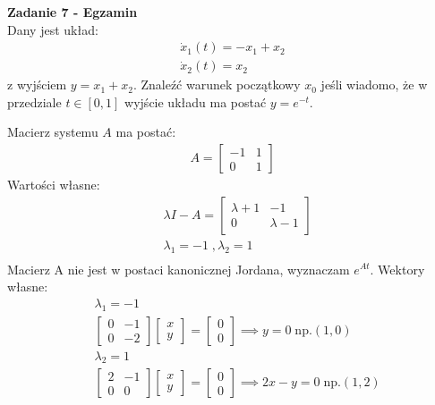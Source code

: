 \documentclass[a4paper,11pt]{article}
\begin{document}
\newpage
\begin{framed}
\textbf{Zadanie 7 - Egzamin} \\ 
Dany jest układ:
\begin{align*}
\dot{x}_1(t)=-x_1+x_2 \\
\dot{x}_2(t)=x_2
\end{align*}
z wyjściem \( y = x_1 + x_2 \). Znaleźć warunek początkowy \( x_0 \) jeśli wiadomo, że w przedziale \( t \in [0,1] \) wyjście układu ma postać \( y = e^{-t} \). 
\end{framed}
Macierz systemu \( A \) ma postać:
\begin{align*}
A = 
\begin{bmatrix}
-1 & 1 \\
0 & 1
\end{bmatrix}
\end{align*}
Wartości własne:
\begin{align*}
&\lambda I - A =
\begin{bmatrix}
\lambda + 1 & -1 \\
0 & \lambda -1
\end{bmatrix} \\
& \lambda _1 = -1 \; , \lambda _ 2 = 1 \\
\end{align*}
Macierz A nie jest w postaci kanonicznej Jordana, wyznaczam \( e^{At} \). Wektory własne: \\
\begin{align*}
&\lambda _1 = -1 \\
&\begin{bmatrix}
0 & -1 \\
0 & -2
\end{bmatrix}
\begin{bmatrix}
x \\
y
\end{bmatrix}
=
\begin{bmatrix}
0 \\
0
\end{bmatrix}
\implies 
y = 0 \; 
\text{np.} (1,0) \\
&\lambda _2 = 1 \\
 &\begin{bmatrix}
2 & -1 \\
0 & 0
\end{bmatrix}
\begin{bmatrix}
x \\
y
\end{bmatrix}
=
\begin{bmatrix}
0 \\
0
\end{bmatrix}
\implies 
2x - y = 0 \;
\text{np.} (1,2) \\
\end{align*}
\end{document}
